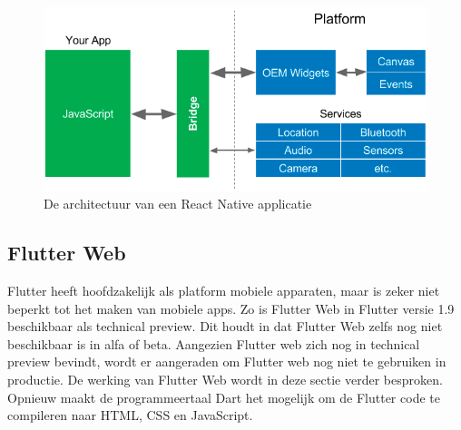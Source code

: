 \begin{figure}[H]
    \centering
    \includegraphics[width=\figureWidthModifier\linewidth]{img/stand-van-zaken/react-native-app-architecture.png}
    \caption{De architectuur van een React Native applicatie \textcite{Leler2017}}
    \label{fig:react-native-app-architecture}
\end{figure}


\subsection{Flutter Web}
Flutter heeft hoofdzakelijk als platform mobiele apparaten, maar is zeker niet beperkt tot het maken van mobiele apps. Zo is Flutter Web in Flutter versie 1.9 beschikbaar als technical preview. Dit houdt in dat Flutter Web zelfs nog niet beschikbaar is in alfa of beta. Aangezien Flutter web zich nog in technical preview bevindt, wordt er aangeraden om Flutter web nog niet te gebruiken in productie. De werking van Flutter Web wordt in deze sectie verder besproken.
\newline
Opnieuw maakt de programmeertaal Dart het mogelijk om de Flutter code te compileren naar HTML, CSS en JavaScript.

